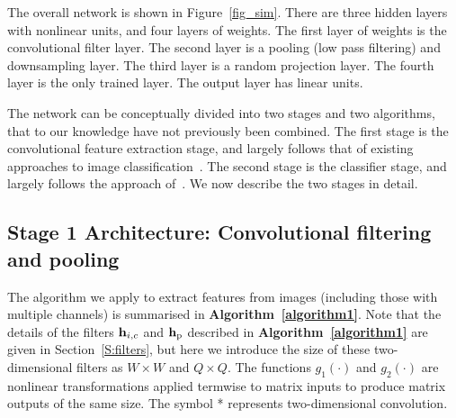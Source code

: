 \documentclass[conference]{IEEEtran}
\begin{document}
The overall network is shown in Figure~\ref{fig_sim}. There are three hidden layers  with nonlinear units, and four layers of weights. The first layer of weights is the convolutional filter layer. The second layer is a pooling (low pass filtering) and downsampling layer. The third layer is a random projection layer. The fourth layer is the only trained layer. The output layer has linear units. 



The network can be conceptually divided into two stages and two algorithms, that to our knowledge have not previously been combined. The first stage is the convolutional feature extraction stage, and largely follows that of existing approaches to image classification~\cite{Coates.11,Coates.11a,Le.10,Sermanet.12}. The second stage is the classifier stage, and largely follows the approach of~\cite{Zhu.15,McDonnell.15PLOS}.  We now describe the two stages in detail.







\subsection{Stage 1 Architecture: Convolutional filtering and pooling}\label{S:Stage1}


The algorithm we apply to extract features from images (including those with multiple channels) is summarised in {\bf Algorithm~\ref{algorithm1}}. Note that the details of the filters ${\bf h}_{i,c}$ and ${\bf h}_{\rm p}$ described in  {\bf Algorithm~\ref{algorithm1}} are given in Section~\ref{S:filters}, but here we introduce the size of these two-dimensional filters as $W\times W$ and $Q\times Q$. The functions $g_1(\cdot)$ and $g_2(\cdot)$ are nonlinear transformations applied termwise to matrix inputs to produce matrix outputs of the same size. The symbol * represents two-dimensional convolution.
\end{document}
